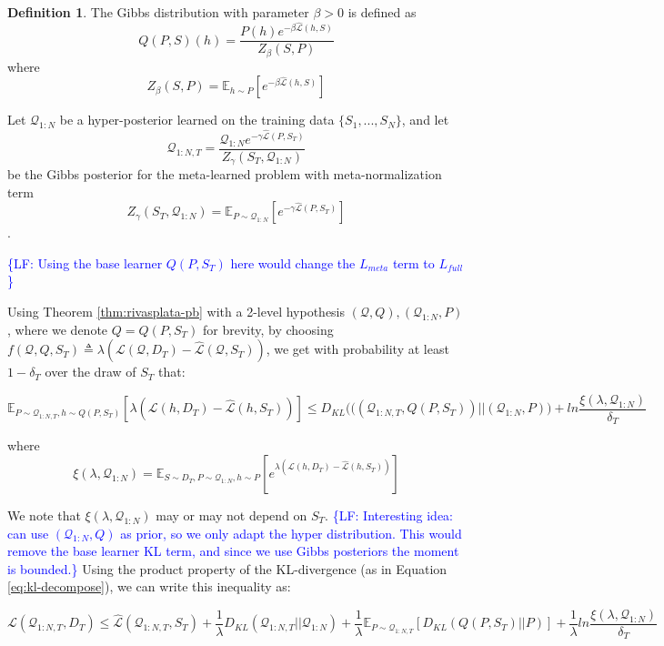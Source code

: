 \documentclass{article}
\theoremstyle{definition}
\newtheorem{defn}{Definition}[section]
\newcommand{\Expect}[2]{\mathbb{E}_{#1}\left [#2 \right ]}
\newcommand{\LF}[1]{\textcolor{blue}{\{LF: #1\}}}
\begin{document}
\begin{defn} \label{defn:Gibbs}
	The Gibbs distribution with parameter $\beta>0$ is defined as $$Q(P,S)(h)=\frac{P(h)e^{-\beta \hat{\mathcal{L}}(h,S)}}{Z_\beta(S,P)}$$ 
	where 
	$$Z_\beta(S,P)=\Expect{h\sim P}{e^{-\beta\hat{\mathcal{L}}(h,S)}}$$
\end{defn}

Let $\mathcal{Q}_{1:N}$ be a hyper-posterior learned on the training data $\{S_1,...,S_N\}$, and let $$\mathcal{Q}_{1:N,T}= \frac{\mathcal{Q}_{1:N}e^{-\gamma\hat{\mathcal{L}}(P,S_T)}}{Z_\gamma(S_T, \mathcal{Q}_{1:N})}$$ be the Gibbs posterior for the meta-learned problem with meta-normalization term $$Z_\gamma(S_T, \mathcal{Q}_{1:N})=\Expect{P\sim \mathcal{Q}_{1:N}}{e^{-\gamma\hat{\mathcal{L}}(P,S_T)}}$$.

\LF{Using the base learner $Q(P,S_T)$ here would change the $L_{meta}$ term to $L_{full}$}

Using Theorem \ref{thm:rivasplata-pb} with a 2-level hypothesis $(\mathcal{Q},Q), (\mathcal{Q}_{1:N}, P)$, where we denote $Q=Q(P, S_T)$ for brevity, by choosing $f(\mathcal{Q}, Q, S_T)\triangleq\lambda\left (\mathcal{L}(\mathcal{Q}, D_T)-\hat{\mathcal{L}}(\mathcal{Q}, S_T)\right )$, we get with probability at least $1-\delta_T$ over the draw of $S_T$ that:

$$\Expect{P\sim \mathcal{Q}_{1:N,T},h\sim Q(P,S_T)}{\lambda\left (\mathcal{L}(h, D_T)-\hat{\mathcal{L}}(h, S_T)\right )} \leq D_{KL} \Big (((\mathcal{Q}_{1:N,T}, Q(P,S_T))||(\mathcal{Q}_{1:N}, P) \Big )+ ln\frac{\xi(\lambda,\mathcal{Q}_{1:N})}{\delta_T}$$

where $$\xi(\lambda,\mathcal{Q}_{1:N})=\Expect{S\sim D_T, P\sim \mathcal{Q}_{1:N}, h\sim P}{e^{\lambda\left (\mathcal{L}(h, D_T)-\hat{\mathcal{L}}(h, S_T)\right )}}$$

We note that $\xi(\lambda,\mathcal{Q}_{1:N})$ may or may not depend on $S_T$. \LF{Interesting idea: can use $(\mathcal{Q}_{1:N}, Q)$ as prior, so we only adapt the hyper distribution. This would remove the base learner KL term, and since we use Gibbs posteriors the moment is bounded.} Using the product property of the KL-divergence (as in Equation \ref{eq:kl-decompose}), we can write this inequality as:

$$\mathcal{L}(\mathcal{Q}_{1:N,T}, D_T) \leq \hat{\mathcal{L}}(\mathcal{Q}_{1:N,T}, S_T) + \frac{1}{\lambda}D_{KL}(\mathcal{Q}_{1:N,T}||\mathcal{Q}_{1:N})+\frac{1}{\lambda}\Expect{P\sim \mathcal{Q}_{1:N,T}}{D_{KL}(Q(P,S_T)||P)}+\frac{1}{\lambda}ln\frac{\xi(\lambda,\mathcal{Q}_{1:N})}{\delta_T}$$
\end{document}
